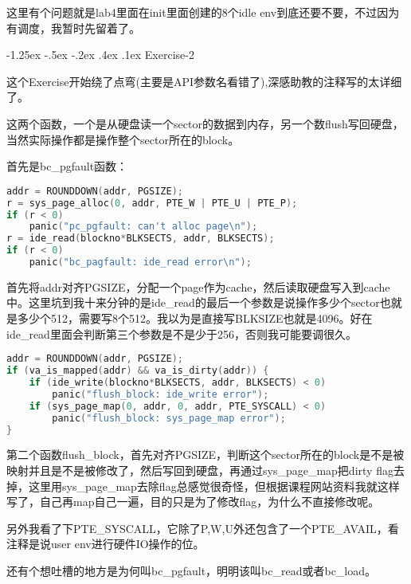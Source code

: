 \documentclass[11pt,a4paper]{article}
\makeatletter
\newcommand{\sihao}{\fontsize{14pt}{\baselineskip}\selectfont}
\renewcommand\subsection{\@startsection{subsection}{1}{\z@}%
{-1.25ex \@plus -.5ex \@minus -.2ex}%
{.4ex \@plus .1ex}%
{\normalfont\sihao\fontspec{黑体}}}
\makeatother
\begin{document}
这里有个问题就是lab4里面在init里面创建的8个idle env到底还要不要，不过因为有调度，我暂时先留着了。

\subsection{Exercise-2}

这个Exercise开始绕了点弯(主要是API参数名看错了),深感助教的注释写的太详细了。

这两个函数，一个是从硬盘读一个sector的数据到内存，另一个数flush写回硬盘，当然实际操作都是操作整个sector所在的block。

首先是bc\_pgfault函数：


\setmainfont{Consolas}
\begin{lstlisting}[language={C},firstnumber=1,title=kern/bc.c] 
addr = ROUNDDOWN(addr, PGSIZE);
r = sys_page_alloc(0, addr, PTE_W | PTE_U | PTE_P);
if (r < 0)
	panic("pc_pgfault: can't alloc page\n");
r = ide_read(blockno*BLKSECTS, addr, BLKSECTS);
if (r < 0)
	panic("bc_pagfault: ide_read error\n");
\end{lstlisting}
\setmainfont[BoldFont=黑体]{宋体}

首先将addr对齐PGSIZE，分配一个page作为cache，然后读取硬盘写入到cache中。这里坑到我十来分钟的是ide\_read的最后一个参数是说操作多少个sector也就是多少个512，需要写8个512。我以为是直接写BLKSIZE也就是4096。好在ide\_read里面会判断第三个参数是不是少于256，否则我可能要调很久。

\setmainfont{Consolas}
\begin{lstlisting}[language={C},firstnumber=1,title=kern/bc.c] 
addr = ROUNDDOWN(addr, PGSIZE);
if (va_is_mapped(addr) && va_is_dirty(addr)) {
	if (ide_write(blockno*BLKSECTS, addr, BLKSECTS) < 0)
		panic("flush_block: ide_write error");
	if (sys_page_map(0, addr, 0, addr, PTE_SYSCALL) < 0)
		panic("flush_block: sys_page_map error");
}
\end{lstlisting}
\setmainfont[BoldFont=黑体]{宋体}

第二个函数flush\_block，首先对齐PGSIZE，判断这个sector所在的block是不是被映射并且是不是被修改了，然后写回到硬盘，再通过sys\_page\_map把dirty flag去掉，这里用sys\_page\_map去除flag总感觉很奇怪，但根据课程网站资料我就这样写了，自己再map自己一遍，目的只是为了修改flag，为什么不直接修改呢。

另外我看了下PTE\_SYSCALL，它除了P,W,U外还包含了一个PTE\_AVAIL，看注释是说user env进行硬件IO操作的位。

还有个想吐槽的地方是为何叫bc\_pgfault，明明该叫bc\_read或者bc\_load。
\end{document}
